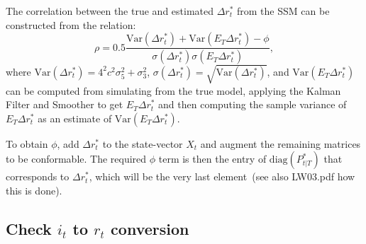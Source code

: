 \documentclass[a4paper,12pt]{article}
\begin{document}
The correlation between the true and estimated $\Delta r_{t}^{\ast }$ from
the SSM can be constructed from the relation:%
\begin{equation}
\rho =0.5\frac{\mathrm{Var}(\Delta r_{t}^{\ast })+\mathrm{Var}(E_{T}\Delta
r_{t}^{\ast })-\phi }{\sigma (\Delta r_{t}^{\ast })\sigma (E_{T}\Delta
r_{t}^{\ast })},
\end{equation}
where $\mathrm{Var}(\Delta r_{t}^{\ast })=4^{2}c^{2}\sigma _{5}^{2}+\sigma
_{3}^{2}$, $\sigma (\Delta r_{t}^{\ast })=\sqrt{\mathrm{Var}(\Delta
r_{t}^{\ast })}$, and $\mathrm{Var}(E_{T}\Delta r_{t}^{\ast })$ can be
computed from simulating from the true model, applying the Kalman Filter and
Smoother to get $E_{T}\Delta r_{t}^{\ast }$ and then computing the sample
variance of $E_{T}\Delta r_{t}^{\ast }$ as an estimate of $\mathrm{Var}%
(E_{T}\Delta r_{t}^{\ast })$.

To obtain $\phi $, add $\Delta r_{t}^{\ast }$ to the state-vector $X_{t}$
and augment the remaining matrices to be conformable. The required $\phi $
term is then the entry of $\mathrm{diag}(P_{t|T}^{\ast })$ that corresponds
to $\Delta r_{t}^{\ast }$, which will be the very last element\ (see also
LW03.pdf how this is done).

\bigskip \pagebreak

\subsection{Check $i_{t}$ to $r_{t}$ conversion}
\end{document}
